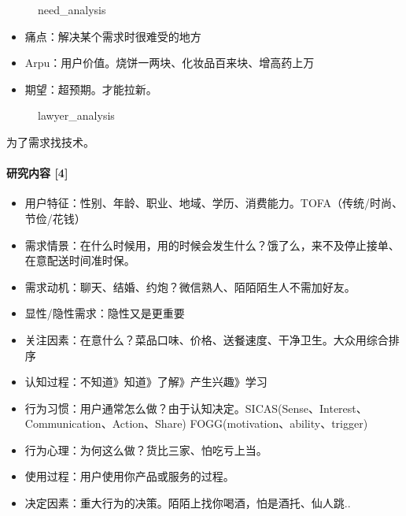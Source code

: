 \documentclass[letterpaper,11pt,english]{sphinxmanual}
\begin{document}
\begin{figure}[H]
\centering
\capstart

\noindent{}
\caption{need\_analysis}\label{\detokenize{chapter_knowledge/users_analysis:id41}}\end{figure}
\begin{itemize}
\item {} 
痛点：解决某个需求时很难受的地方

\item {} 
Arpu：用户价值。烧饼一两块、化妆品百来块、增高药上万

\item {} 
期望：超预期。才能拉新。

\end{itemize}

\begin{figure}[H]
\centering
\capstart

\noindent{}
\caption{lawyer\_analysis}\label{\detokenize{chapter_knowledge/users_analysis:id42}}\end{figure}

为了需求找技术。


\paragraph{研究内容 {[}4{]}}
\label{\detokenize{chapter_knowledge/users_analysis:id24}}\begin{itemize}
\item {} 
用户特征：性别、年龄、职业、地域、学历、消费能力。TOFA（传统/时尚、节俭/花钱）

\item {} 
需求情景：在什么时候用，用的时候会发生什么？饿了么，来不及停止接单、在意配送时间准时保。

\item {} 
需求动机：聊天、结婚、约炮？微信熟人、陌陌陌生人不需加好友。

\item {} 
显性/隐性需求：隐性又是更重要

\item {} 
关注因素：在意什么？菜品口味、价格、送餐速度、干净卫生。大众用综合排序

\item {} 
认知过程：不知道》知道》了解》产生兴趣》学习

\item {} 
行为习惯：用户通常怎么做？由于认知决定。SICAS(Sense、Interest、Communication、Action、Share)
FOGG(motivation、ability、trigger)

\item {} 
行为心理：为何这么做？货比三家、怕吃亏上当。

\item {} 
使用过程：用户使用你产品或服务的过程。

\item {} 
决定因素：重大行为的决策。陌陌上找你喝酒，怕是酒托、仙人跳..

\end{itemize}
\end{document}
